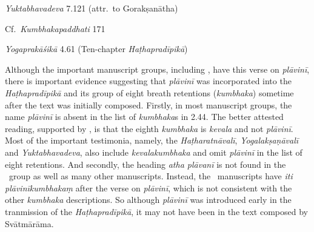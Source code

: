 \begin{ekdosis}
\begin{testimonia}[hp02_071]
\emph{Yuktabhavadeva} 7.121 (attr.~to Gorakṣanātha)

\begin{versinnote}
\end{versinnote}

Cf.~\emph{Kumbhakapaddhati} 171

\begin{versinnote}
\end{versinnote}

\emph{Yogaprakāśikā} 4.61 (Ten-chapter \emph{Haṭhapradīpikā})

\begin{versinnote}
\end{versinnote}
\end{testimonia}

\begin{philcomm}[hp02_071]
Although the important manuscript groups, including \textalpha, have this verse on \emph{plāvinī}, there is important evidence suggesting that \emph{plāvinī} was incorporated into the \emph{Haṭhapradīpikā} and its group of eight breath retentions (\emph{kumbhaka}) sometime after the text was initially composed. Firstly, in most manuscript groups, the name \emph{plāvinī} is absent in the list of \emph{kumbhaka}s in 2.44. The better attested reading, supported by \textalpha, is that the eighth \emph{kumbhaka} is \emph{kevala} and not \emph{plāvinī}. Most of the important testimonia, namely, the \emph{Haṭharatnāvalī}, \emph{Yogalakṣaṇāvalī} and \emph{Yuktabhavadeva}, also include \emph{kevalakumbhaka} and omit \emph{plāvinī} in the list of eight retentions. And secondly, the heading \emph{atha plāvanī} is not found in the \textalpha\ group as well as many other manuscripts. Instead, the \textalpha\ manuscripts have \emph{iti plāvinīkumbhakaṃ} after the verse on \emph{plāvinī}, which is not consistent with the other \emph{kumbhaka} descriptions. So although \emph{plāvinī} was introduced early in the tranmission of the \emph{Haṭhapradīpikā}, it may not have been in the text composed by Svātmārāma.\lb


\end{philcomm}
\end{ekdosis}
